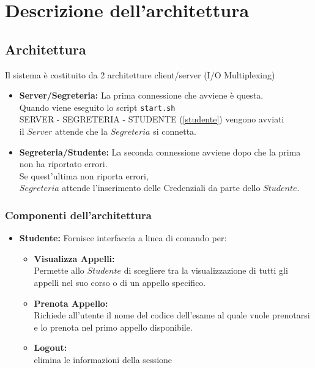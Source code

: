 \chapter{Descrizione dell'architettura} 
\newpage

\section{Architettura}
	Il sistema è costituito da 2 architetture client/server
	(I/O Multiplexing)
	\begin{itemize}
		\item \textbf{Server/Segreteria:} La prima connessione che avviene è questa.\\
		Quando viene eseguito lo script \texttt{start.sh}\\
		SERVER - SEGRETERIA - STUDENTE (\ref{studente}) vengono avviati\\
		il $Server$ attende che la $Segreteria$ si connetta.
		\item \textbf{Segreteria/Studente:} La seconda connessione avviene dopo che la prima non ha riportato errori.\\
		Se quest'ultima non riporta errori, \\
		$Segreteria$ attende l'inserimento delle Credenziali da parte dello $Studente$.
	\end{itemize}
	\newpage
\subsection{Componenti dell'architettura}
\begin{itemize}
	\item \textbf{Studente:}\label{studente} Fornisce interfaccia a linea di comando per:\\
	\begin{itemize}
	\item \textbf {Visualizza Appelli:}\\ Permette allo $Studente$ di scegliere tra la visualizzazione di tutti gli appelli nel suo corso o di un appello specifico.
	\item \textbf {Prenota Appello:}\\
	Richiede all'utente il nome del codice dell'esame al quale vuole prenotarsi e lo prenota nel primo appello disponibile.
	\item \textbf {Logout:}\\
	elimina le informazioni della sessione
	\end{itemize}
	
\end{itemize}

